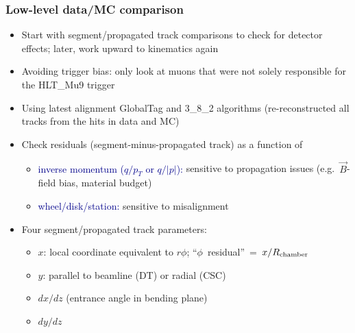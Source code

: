 \documentclass[compress]{beamer}
\newcommand{\s}[1]{{\mbox{\scriptsize #1}}}
\begin{document}
\begin{frame}
\frametitle{Low-level data/MC comparison}

\begin{itemize}\setlength{\itemsep}{0.1 cm}
\item Start with segment/propagated track comparisons to check for
  detector effects; later, work upward to kinematics again
\item Avoiding trigger bias: only look at muons that were not solely
  responsible for the HLT\_Mu9 trigger
\item Using latest alignment GlobalTag and 3\_8\_2 algorithms
  (re-reconstructed all tracks from the hits in data and MC)
\item Check residuals (segment-minus-propagated track) as a function of
\begin{itemize}\setlength{\itemsep}{0.2 cm}
\item \textcolor{darkblue}{inverse momentum ($q/p_T$ or $q/|p|$):} sensitive to propagation issues (e.g.\ $\vec{B}$-field bias, material budget)
\item \textcolor{darkblue}{wheel/disk/station:} sensitive to misalignment
\end{itemize}
\item Four segment/propagated track parameters:
\begin{itemize}
\item $x$: local coordinate equivalent to $r\phi$; \mbox{``$\phi$ residual'' = $x/R_\s{chamber}$\hspace{-1 cm}}
\item $y$: parallel to beamline (DT) or radial (CSC)
\item $dx/dz$ (entrance angle in bending plane)
\item $dy/dz$
\end{itemize}
\end{itemize}
\end{frame}
\end{document}

